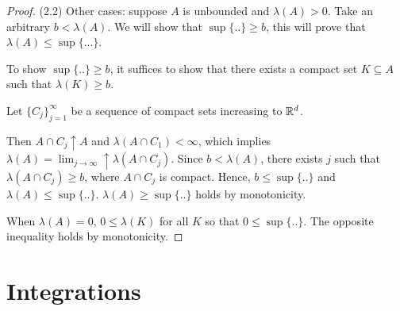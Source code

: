 \documentclass[11pt]{article}
\begin{document}
\begin{theorem}
\begin{proof}
			(2.2) Other cases: suppose $A$ is unbounded and $\lambda(A) > 0$. Take an arbitrary $b < \lambda(A)$. We will show that $\sup\{..\} \geq b$, this will prove that $\lambda(A) \leq \sup\{...\}$.
			
			To show $\sup\{..\} \geq b$, it suffices to show that there exists a compact set $K \subseteq A$ such that $\lambda(K) \geq b$.
			
			Let $\{C_j\}_{j=1}^\infty$ be a sequence of compact sets increasing to $\mathbb{R}^d$.
			
			Then $A \cap C_j \uparrow A$ and $\lambda(A \cap C_1) < \infty$, which implies $\lambda(A) = \lim_{j \to \infty} \uparrow \lambda(A \cap C_j)$. Since $b < \lambda(A)$, there exists $j$ such that $\lambda(A \cap C_j) \geq b$, where $A \cap C_j$ is compact. Hence, $b \leq \sup\{..\}$ and $\lambda(A) \leq \sup\{..\}$.
			$\lambda(A) \geq \sup\{..\}$ holds by monotonicity.
			
			When $\lambda(A) = 0$, $0 \leq \lambda(K)$ for all $K$ so that $0 \leq \sup\{..\}$. The opposite inequality holds by monotonicity.
		\end{proof}
	\end{theorem}

	\section{Integrations}
\end{document}
